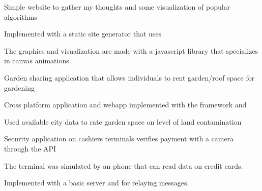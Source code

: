 \documentclass[]{deedy-resume-openfont}
\begin{document}
\begin{minipage}[t]{0.66\textwidth}
\begin{tightemize}
\item Simple website to gather my thoughts and some visualization of popular algorithms
\item Implemented with  a static site generator that uses 
\item The graphics and visualization are made with  a javascript library that specializes in canvas animations
\end{tightemize}
\sectionsep

\begin{tightemize}
\item Garden sharing application that allows individuals to rent garden/roof space for gardening
\item Cross platform application and webapp implemented with the  framework and 
\item Used available city data to rate garden space on level of land contamination
\end{tightemize}
\sectionsep

\begin{tightemize}
\item Security application on cashiers terminals verifies payment with a camera through the  API
\item The terminal was simulated by an  phone that can read  data on credit cards.
\item Implemented with a basic  server and  for relaying messages.
\end{tightemize}
\sectionsep


\end{minipage} 
\end{document}
